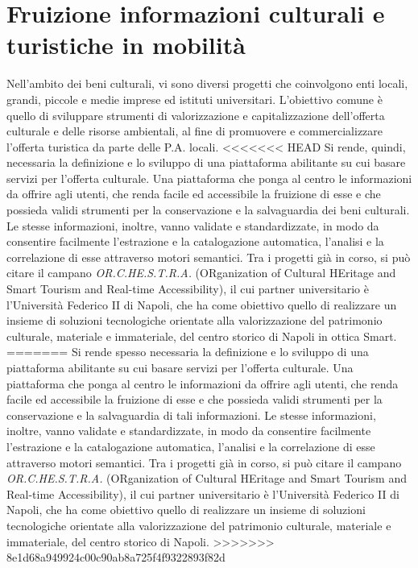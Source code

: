 \section{Fruizione informazioni culturali e turistiche in mobilità}
Nell'ambito dei beni culturali, vi sono diversi progetti che coinvolgono enti locali, grandi, piccole e medie imprese ed istituti universitari.
L'obiettivo comune è quello di sviluppare strumenti di valorizzazione e capitalizzazione dell'offerta culturale e delle risorse ambientali, al fine di promuovere e commercializzare l'offerta turistica da parte delle P.A. locali.
<<<<<<< HEAD
Si rende, quindi, necessaria la definizione e lo sviluppo di una piattaforma abilitante su cui basare servizi per l'offerta culturale. Una piattaforma che ponga al centro le informazioni da offrire agli utenti, che renda facile ed accessibile la fruizione di esse e che possieda validi strumenti per la conservazione e la salvaguardia dei beni culturali.
Le stesse informazioni, inoltre, vanno validate e standardizzate, in modo da consentire facilmente l'estrazione e la catalogazione automatica, l'analisi e la correlazione di esse attraverso motori semantici.
Tra i progetti già in corso, si può citare il campano
\emph{OR.C.HE.S.T.R.A.} (ORganization of Cultural HEritage and Smart Tourism and Real-time Accessibility), il cui partner universitario è l'Università Federico II di Napoli, che ha come obiettivo quello di realizzare un insieme di soluzioni tecnologiche orientate alla valorizzazione del patrimonio culturale, materiale e immateriale, del centro storico di Napoli in ottica Smart. 
=======
Si rende spesso necessaria la definizione e lo sviluppo di una piattaforma abilitante su cui basare servizi per l'offerta culturale. Una piattaforma che ponga al centro le informazioni da offrire agli utenti, che renda facile ed accessibile la fruizione di esse e che possieda validi strumenti per la conservazione e la salvaguardia di tali informazioni.
Le stesse informazioni, inoltre, vanno validate e standardizzate, in modo da consentire facilmente l'estrazione e la catalogazione automatica, l'analisi e la correlazione di esse attraverso motori semantici.
Tra i progetti già in corso, si può citare il campano
\emph{OR.C.HE.S.T.R.A.} (ORganization of Cultural HEritage and Smart Tourism and Real-time Accessibility), il cui partner universitario è l'Università Federico II di Napoli, che ha come obiettivo quello di realizzare un insieme di soluzioni tecnologiche orientate alla valorizzazione del patrimonio culturale, materiale e immateriale, del centro storico di Napoli. 
>>>>>>> 8e1d68a949924c00c90ab8a725f4f9322893f82d

